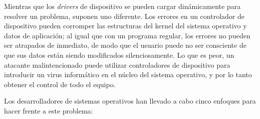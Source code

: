 \documentclass[10pt]{book}
\begin{document}
Mientras que los \textit{drivers} de dispositivo se pueden cargar dinámicamente para resolver un problema, suponen uno diferente. Los errores en un controlador de dispositivo pueden corromper las estructuras del kernel del sistema operativo y datos de aplicación; al igual que con un programa regular, los errores no pueden ser atrapados de inmediato, de modo que el usuario puede no ser consciente de que sus datos están siendo modificados silenciosamente. Lo que es peor, un atacante malintencionado puede utilizar controladores de dispositivo para introducir un virus informático en el núcleo del sistema operativo, y por lo tanto obtener el control de todo el equipo.

Los desarrolladores de sistemas operativos han llevado a cabo cinco enfoques para hacer frente a este problema:
\end{document}
